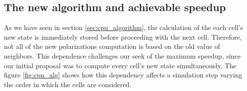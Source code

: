 \subsection{The new algorithm and achievable speedup}\label{sec:new_algorithm}
As we have seen in section \ref{sec:cpu_algorithm}, the calculation of the each cell's new state is immediately stored before proceeding with the next cell. Therefore, not all of the new polarizations computation is based on the old value of neighbors. This dependence challenges our seek of the maximum speedup, since our initial proposal was to compute every cell's new state simultaneously. The figure \ref{fig:cpu_alg} shows how this dependency affects a simulation step varying the order in which the cells are considered.
\begin{figure}[h!tb]
	\centering

\end{figure}
